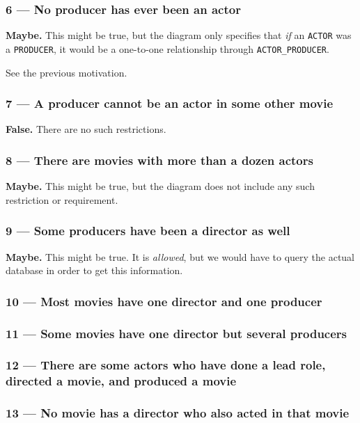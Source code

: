 \subsubsection{6 --- No producer has ever been an actor}
\textbf{Maybe.} This might be true, but the diagram only specifies that
\emph{if} an \texttt{ACTOR} was a \texttt{PRODUCER}, it would be a one-to-one
relationship through \texttt{ACTOR\_PRODUCER}.

See the previous motivation. 

\subsubsection{7 --- A producer cannot be an actor in some other movie}
\textbf{False.} There are no such restrictions.

\subsubsection{8 --- There are movies with more than a dozen actors}
\textbf{Maybe.} This might be true, but the diagram does not include
any such restriction or requirement.

\subsubsection{9 --- Some producers have been a director as well}
\textbf{Maybe.} This might be true. It is \emph{allowed}, but we would have
to query the actual database in order to get this information.

\subsubsection{10 --- Most movies have one director and one producer}

\subsubsection{11 --- Some movies have one director but several producers}

\subsubsection{12 --- There are some actors who have done a lead role, directed a movie, and produced a movie}

\subsubsection{13 --- No movie has a director who also acted in that movie}

